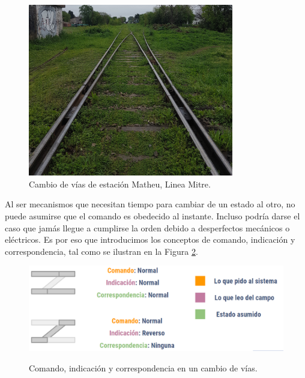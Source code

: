     \begin{figure}[H]
        \centering
        \includegraphics[width=0.8\textwidth]{Figuras/Cambios_2.jpg}
        \centering\caption{Cambio de vías de estación Matheu, Linea Mitre.}
        \label{fig:cambios_2}
    \end{figure}



    Al ser mecanismos que necesitan tiempo para cambiar de un estado al otro, no puede asumirse que el comando es obedecido al instante. Incluso podría darse el caso que jamás llegue a cumplirse la orden debido a desperfectos mecánicos o eléctricos. Es por eso que introducimos los conceptos de comando, indicación y correspondencia, tal como se ilustran en la Figura \ref{fig:cambios_4}.

    \begin{figure}[H]
        \centering
        \includegraphics[width=1\textwidth]{Figuras/cambios}
   \textit{}     \centering\caption{Comando, indicación y correspondencia en un cambio de vías.}
        \label{fig:cambios_4}
    \end{figure}
    
